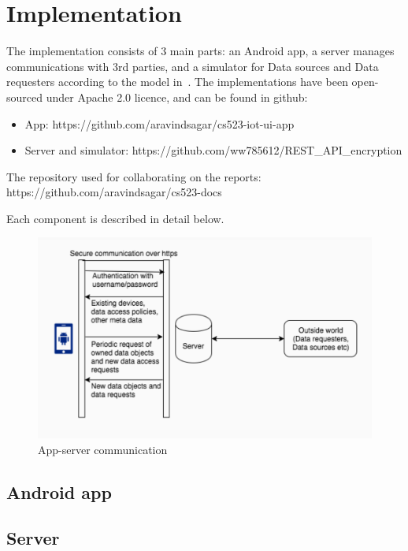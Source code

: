 \documentclass[conference]{IEEEtran}
\begin{document}
\section{Implementation}
The implementation consists of 3 main parts: an Android app, a server manages communications with 3rd parties, and a simulator for Data sources and Data requesters according to the model in~\cite{campbell}. The implementations have been open-sourced under Apache 2.0 licence, and can be found in github:
\begin{itemize}
	\item App: https://github.com/\linebreak[0]aravindsagar/\linebreak[0]cs523-iot-ui-app
	\item Server and simulator: https://github.com/\linebreak[0]ww785612/\linebreak[0]REST\_API\_encryption
\end{itemize}

The repository used for collaborating on the reports: https://github.com/\linebreak[0]aravindsagar/\linebreak[0]cs523-docs

Each component is described in detail below.

\begin{figure}[t]
	\includegraphics[width=0.95\linewidth]{app_server.png}
	\caption{App-server communication}
	\label{fig:app_server_comm}
\end{figure}
\subsection{Android app}

\subsection{Server}

\end{document}
